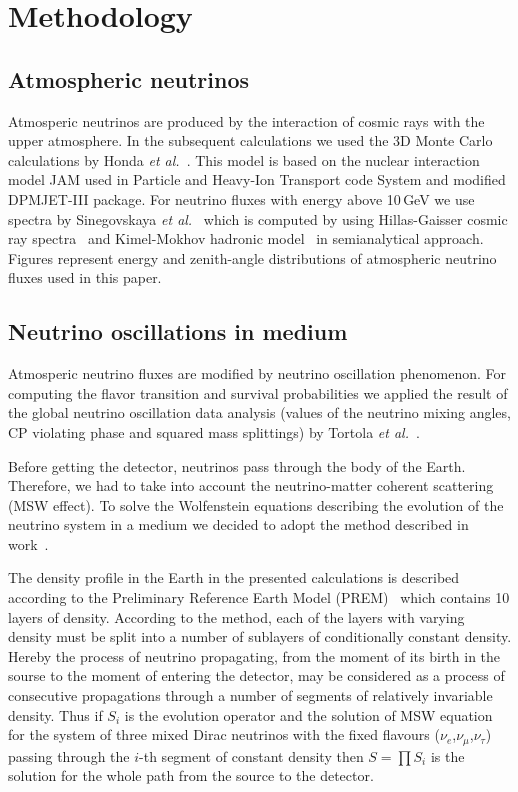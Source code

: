 \section{Methodology}
\subsection{Atmospheric neutrinos}
Atmosperic neutrinos are produced by the interaction of cosmic rays with the upper atmosphere. In the subsequent calculations we used the 3D Monte Carlo calculations by Honda \textit{et al.}~\cite{Honda:2011nf}. This model is based on the nuclear interaction model JAM used in Particle and Heavy-Ion Transport code System and modified DPMJET-III package. For neutrino fluxes with energy above 10\,GeV we use spectra by Sinegovskaya \textit{et al.}~\cite{Sinegovskaya:2014pia} which is computed by using Hillas-Gaisser cosmic ray spectra~\cite{Gaisser:2013ira} and Kimel-Mokhov hadronic model~\cite{Kalinovsky:1989kk} in semianalytical approach. Figures represent energy and zenith-angle distributions of atmospheric neutrino fluxes used in this paper.

\subsection{Neutrino oscillations in medium}
Atmosperic neutrino fluxes are modified by neutrino oscillation phenomenon. For computing the flavor transition and survival probabilities we applied the result of the global neutrino oscillation data analysis (values of the neutrino mixing angles, CP violating phase and squared mass splittings) by Tortola \textit{et al.}~\cite{Tortola:2012te}.

Before getting the detector, neutrinos pass through the body of the Earth. Therefore, we had to take into account the neutrino-matter coherent scattering (MSW effect). To solve the Wolfenstein equations describing the evolution of the neutrino system in a medium we decided to adopt the method described in work~\cite{Naumov:2001ci}.

The density profile in the Earth in the presented calculations is described according to the Preliminary Reference Earth Model (PREM)~\cite{Dziewonski:1981xy} which contains 10 layers of density. According to the method, each of the layers with varying density must be split into a number of sublayers of conditionally constant density. Hereby the process of neutrino propagating, from the moment of its birth in the sourse to the moment of entering the detector, may be considered as a process of consecutive propagations through a number of segments of relatively invariable density. Thus if ${S_{i}}$ is the evolution operator and the solution of MSW equation for the system of three mixed Dirac neutrinos with the fixed flavours ($\nu_{e}$,$\nu_{\mu}$,$\nu_{\tau}$) passing through the $i$-th segment of constant density then $S=\prod{S_{i}}$ is the solution for the whole path from the source to the detector.

